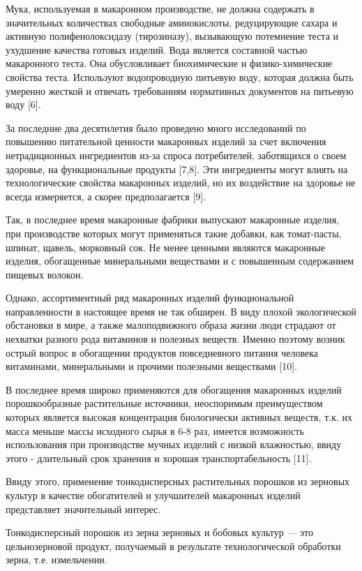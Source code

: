 Мука, используемая в макаронном производстве, не должна содержать в
значительных количествах свободные аминокислоты, редуцирующие сахара и
активную полифенолоксидазу (тирозиназу), вызывающую потемнение теста и
ухудшение качества готовых изделий. Вода является составной частью
макаронного теста. Она обусловливает биохимические и физико-химические
свойства теста. Используют водопроводную питьевую воду, которая должна
быть умеренно жесткой и отвечать требованиям нормативных документов на
питьевую воду {[}6{]}.

За последние два десятилетия было проведено много исследований по
повышению питательной ценности макаронных изделий за счет включения
нетрадиционных ингредиентов из-за спроса потребителей, заботящихся о
своем здоровье, на функциональные продукты {[}7,8{]}. Эти ингредиенты
могут влиять на технологические свойства макаронных изделий, но их
воздействие на здоровье не всегда измеряется, а скорее предполагается
{[}9{]}.

Так, в последнее время макаронные фабрики выпускают макаронные изделия,
при производстве которых могут применяться такие добавки, как
томат-пасты, шпинат, щавель, морковный сок. Не менее ценными являются
макаронные изделия, обогащенные минеральными веществами и с повышенным
содержанием пищевых волокон.

Однако, ассортиментный ряд макаронных изделий функциональной
направленности в настоящее время не так обширен. В виду плохой
экологической обстановки в мире, а также малоподвижного образа жизни
люди страдают от нехватки разного рода витаминов и полезных веществ.
Именно поэтому возник острый вопрос в обогащении продуктов повседневного
питания человека витаминами, минеральными и прочими полезными веществами
{[}10{]}.

В последнее время широко применяются для обогащения макаронных изделий
порошкообразные растительные источники, неоспоримым преимуществом
которых является высокая концентрация биологически активных веществ,
т.к. их масса меньше массы исходного сырья в 6-8 раз, имеется
возможность использования при производстве мучных изделий с низкой
влажностью, ввиду этого - длительный срок хранения и хорошая
транспортабельность {[}11{]}.

Ввиду этого, применение тонкодисперсных растительных порошков из
зерновых культур в качестве обогатителей и улучшителей макаронных
изделий представляет значительный интерес.

Тонкодисперсный порошок из зерна зерновых и бобовых культур --- это
цельнозерновой продукт, получаемый в результате технологической
обработки зерна, т.е. измельчении.

